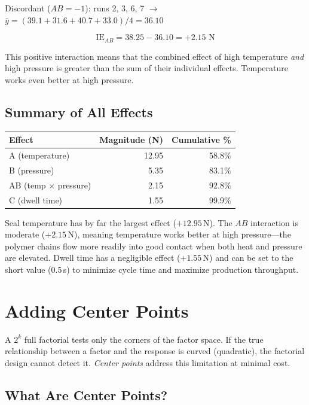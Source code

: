 \documentclass[11pt]{book}
\begin{document}
Discordant ($AB = -1$): runs 2, 3, 6, 7 $\to$ $\bar{y} = (39.1 + 31.6 + 40.7 + 33.0)/4 = 36.10$

\[
\text{IE}_{AB} = 38.25 - 36.10 = +2.15 \text{ N}
\]

This positive interaction means that the combined effect of high temperature
\emph{and} high pressure is greater than the sum of their individual effects.
Temperature works even better at high pressure.

\subsection{Summary of All Effects}

\begin{center}
\begin{tabular}{lrr}
\toprule
Effect & Magnitude (N) & Cumulative \% \\
\midrule
A (temperature) & 12.95 & 58.8\% \\
B (pressure) & 5.35 & 83.1\% \\
AB (temp $\times$ pressure) & 2.15 & 92.8\% \\
C (dwell time) & 1.55 & 99.9\% \\
\bottomrule
\end{tabular}
\end{center}

Seal temperature has by far the largest effect ($+12.95$\,N). The $AB$
interaction is moderate ($+2.15$\,N), meaning temperature works better at high
pressure---the polymer chains flow more readily into good contact when both heat
and pressure are elevated. Dwell time has a negligible effect ($+1.55$\,N) and
can be set to the short value (0.5\,s) to minimize cycle time and maximize
production throughput.

\section{Adding Center Points}

A $2^k$ full factorial tests only the corners of the factor space. If the true
relationship between a factor and the response is curved (quadratic), the
factorial design cannot detect it. \emph{Center points} address this limitation
at minimal cost.

\subsection{What Are Center Points?}
\end{document}
